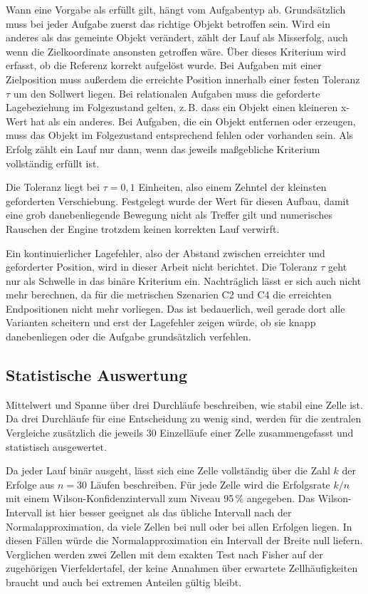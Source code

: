 Wann eine Vorgabe als erfüllt gilt, hängt vom Aufgabentyp ab.
Grundsätzlich muss bei jeder Aufgabe zuerst das richtige Objekt betroffen sein.
Wird ein anderes als das gemeinte Objekt verändert, zählt der Lauf als Misserfolg, auch wenn die Zielkoordinate ansonsten getroffen wäre.
Über dieses Kriterium wird erfasst, ob die Referenz korrekt aufgelöst wurde.
Bei Aufgaben mit einer Zielposition muss außerdem die erreichte Position innerhalb einer festen Toleranz $\tau$ um den Sollwert liegen.
Bei relationalen Aufgaben muss die geforderte Lagebeziehung im Folgezustand gelten, z.\,B. dass ein Objekt einen kleineren x-Wert hat als ein anderes.
Bei Aufgaben, die ein Objekt entfernen oder erzeugen, muss das Objekt im Folgezustand entsprechend fehlen oder vorhanden sein.
Als Erfolg zählt ein Lauf nur dann, wenn das jeweils maßgebliche Kriterium vollständig erfüllt ist.

Die Toleranz liegt bei $\tau = 0{,}1$ Einheiten, also einem Zehntel der kleinsten geforderten Verschiebung.
Festgelegt wurde der Wert für diesen Aufbau, damit eine grob danebenliegende Bewegung nicht als Treffer gilt und numerisches Rauschen der Engine trotzdem keinen korrekten Lauf verwirft.

Ein kontinuierlicher Lagefehler, also der Abstand zwischen erreichter und geforderter Position, wird in dieser Arbeit nicht berichtet.
Die Toleranz $\tau$ geht nur als Schwelle in das binäre Kriterium ein.
Nachträglich lässt er sich auch nicht mehr berechnen, da für die metrischen Szenarien C2 und C4 die erreichten Endpositionen nicht mehr vorliegen.
Das ist bedauerlich, weil gerade dort alle Varianten scheitern und erst der Lagefehler zeigen würde, ob sie knapp danebenliegen oder die Aufgabe grundsätzlich verfehlen.

\subsection*{Statistische Auswertung}

Mittelwert und Spanne über drei Durchläufe beschreiben, wie stabil eine Zelle ist.
Da drei Durchläufe für eine Entscheidung zu wenig sind, werden für die zentralen Vergleiche zusätzlich die jeweils 30 Einzelläufe einer Zelle zusammengefasst und statistisch ausgewertet.

Da jeder Lauf binär ausgeht, lässt sich eine Zelle vollständig über die Zahl $k$ der Erfolge aus $n = 30$ Läufen beschreiben.
Für jede Zelle wird die Erfolgsrate $k/n$ mit einem Wilson-Konfidenzintervall zum Niveau 95\,\% angegeben.
Das Wilson-Intervall ist hier besser geeignet als das übliche Intervall nach der Normalapproximation, da viele Zellen bei null oder bei allen Erfolgen liegen.
In diesen Fällen würde die Normalapproximation ein Intervall der Breite null liefern.
Verglichen werden zwei Zellen mit dem exakten Test nach Fisher auf der zugehörigen Vierfeldertafel, der keine Annahmen über erwartete Zellhäufigkeiten braucht und auch bei extremen Anteilen gültig bleibt.

